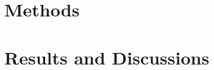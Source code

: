 

%

\section{Methods}
\label{sec:methods}



\cite{cui2018}
\section{Results and Discussions}
\label{sec:results}